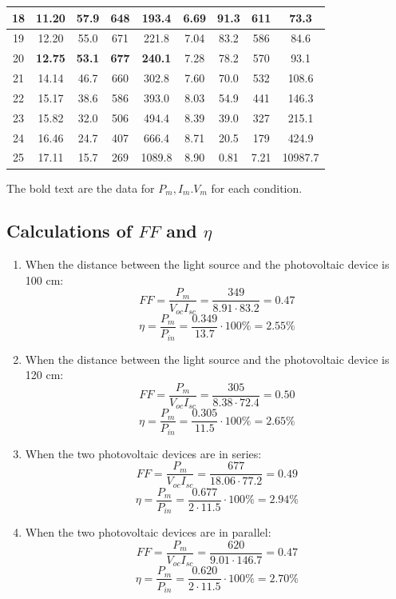 \documentclass[12pt]{article}
\begin{document}
\begin{table}[H]
\begin{tabular}{|c|c|c|c|c|c|c|c|c|}
18 & 11.20    & 57.9      & 648 &193.4     & 6.69     & 91.3      & 611     &73.3 \\ \hline
19 & 12.20    & 55.0      & 671 &221.8     & 7.04     & 83.2      & 586     &84.6 \\ \hline
20 & \textbf{12.75}    & \textbf{53.1}      & \textbf{677} &\textbf{240.1}     & 7.28     & 78.2      & 570   &93.1   \\ \hline
21 & 14.14    & 46.7      & 660 &302.8     & 7.60     & 70.0      & 532    &108.6  \\ \hline
22 & 15.17    & 38.6      & 586 &393.0     & 8.03     & 54.9      & 441    &146.3  \\ \hline
23 & 15.82    & 32.0      & 506 &494.4     & 8.39     & 39.0      & 327    &215.1  \\ \hline
24 & 16.46    & 24.7      & 407 &666.4     & 8.71     & 20.5      & 179    &424.9  \\ \hline
25 & 17.11    & 15.7      & 269 &1089.8     & 8.90     & 0.81      & 7.21   &10987.7  \\ \hline
\end{tabular}
\end{table}
The bold text are the data for $P_m,I_m.V_m$ for each condition.
\subsection{Calculations of $FF$ and $\eta$}
\begin{enumerate}
\item When the distance between the light source and the photovoltaic device is 100 cm:
$$FF=\frac{P_m}{V_{oc}I_{sc}}=\frac{349}{8.91\cdot83.2}=0.47$$
$$\eta=\frac{P_m}{P_{in}}=\frac{0.349}{13.7}\cdot100\%=2.55\%$$
\item When the distance between the light source and the photovoltaic device is 120 cm:
$$FF=\frac{P_m}{V_{oc}I_{sc}}=\frac{305}{8.38\cdot72.4}=0.50$$
$$\eta=\frac{P_m}{P_{in}}=\frac{0.305}{11.5}\cdot100\%=2.65\%$$
\item When the two photovoltaic devices are in series:
$$FF=\frac{P_m}{V_{oc}I_{sc}}=\frac{677}{18.06\cdot77.2}=0.49$$
$$\eta=\frac{P_m}{P_{in}}=\frac{0.677}{2\cdot11.5}\cdot100\%=2.94\%$$
\item When the two photovoltaic devices are in parallel:
$$FF=\frac{P_m}{V_{oc}I_{sc}}=\frac{620}{9.01\cdot146.7}=0.47$$
$$\eta=\frac{P_m}{P_{in}}=\frac{0.620}{2\cdot11.5}\cdot100\%=2.70\%$$
\end{enumerate}
\end{document}
